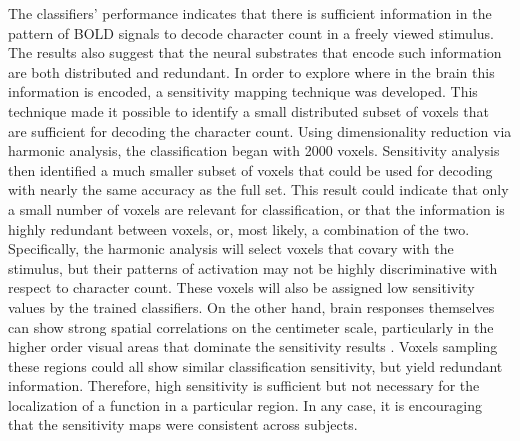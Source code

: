 \documentclass[preprint,5p,authoryear]{elsarticle}
\begin{document}
The classifiers' performance indicates that there is sufficient information in the pattern of BOLD signals to decode character count in a freely viewed stimulus. 
The results also suggest that the neural substrates that encode such information are both distributed and redundant.
In order to explore where in the brain this information is encoded, a sensitivity mapping technique was developed.
This technique made it possible to identify a small distributed subset of voxels that are sufficient for decoding the character count.
Using dimensionality reduction via harmonic analysis, the classification began with 2000 voxels.
Sensitivity analysis then identified a much smaller subset of voxels that could be used for decoding with nearly the same accuracy as the full set.
This result could indicate that only a small number of voxels are relevant for classification, or that the information is highly redundant between voxels, or, most likely, a combination of the two.
Specifically, the harmonic analysis will select voxels that covary with the stimulus, but their patterns of activation may not be highly discriminative with respect to character count.
These voxels will also be assigned low sensitivity values by the trained classifiers.
On the other hand, brain responses themselves can show strong spatial correlations on the centimeter scale, particularly in the higher order visual areas that dominate the sensitivity results \citep{Engel1997}. 
Voxels sampling these regions could all show similar classification sensitivity, but yield redundant information.
Therefore, high sensitivity is sufficient but not necessary for the localization of a function in a particular region.
In any case, it is encouraging that the sensitivity maps were consistent across subjects.
\end{document}
